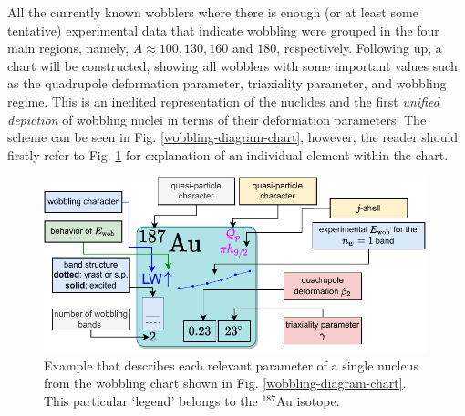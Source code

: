 All the currently known wobblers where there is enough (or at least some tentative) experimental data that indicate wobbling were grouped in the four main regions, namely, $A\approx 100, 130, 160$ and $180$, respectively. Following up, a chart will be constructed, showing all wobblers with some important values such as the quadrupole deformation parameter, triaxiality parameter, and wobbling regime. This is an inedited representation of the nuclides and the first \emph{unified depiction} of wobbling nuclei in terms of their deformation parameters. The scheme can be seen in Fig. \ref{wobbling-diagram-chart}, however, the reader should firstly refer to Fig. \ref{wobbling-diagrams-legend} for explanation of an individual element within the chart.
\begin{figure}
    \centering
    \includegraphics[width=0.99\textwidth]{Chapters/Figures/wobblers-chart-legend.pdf}
    \caption{Example that describes each relevant parameter of a single nucleus from the wobbling chart shown in Fig. \ref{wobbling-diagram-chart}. This particular `legend' belongs to the $^{187}$Au isotope.}
    \label{wobbling-diagrams-legend}
\end{figure}
